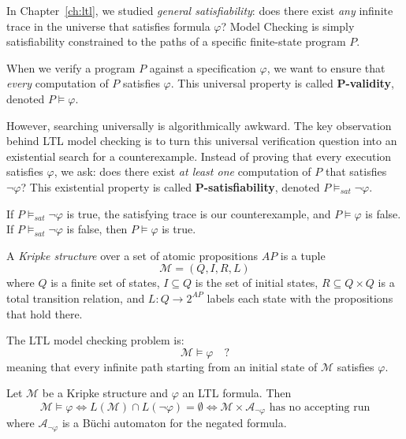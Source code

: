 In Chapter~\ref{ch:ltl}, we studied \emph{general satisfiability}: does there exist \emph{any} infinite trace in the universe that satisfies formula $\varphi$? Model Checking is simply satisfiability constrained to the paths of a specific finite-state program $P$.

When we verify a program $P$ against a specification $\varphi$, we want to ensure that \emph{every} computation of $P$ satisfies $\varphi$. This universal property is called \textbf{P-validity}, denoted $P \models \varphi$. 

However, searching universally is algorithmically awkward. The key observation behind LTL model checking is to turn this universal verification question into an existential search for a counterexample. Instead of proving that every execution satisfies $\varphi$, we ask: does there exist \emph{at least one} computation of $P$ that satisfies $\neg\varphi$? This existential property is called \textbf{P-satisfiability}, denoted $P \models_{sat} \neg\varphi$.

If $P \models_{sat} \neg\varphi$ is true, the satisfying trace is our counterexample, and $P \models \varphi$ is false. If $P \models_{sat} \neg\varphi$ is false, then $P \models \varphi$ is true.

\begin{definition}
\label{def:kripke-structure}
A \emph{Kripke structure} over a set of atomic propositions $AP$ is a tuple
\[
  \mathcal{M} = (Q, I, R, L)
\]
where $Q$ is a finite set of states, $I \subseteq Q$ is the set of initial
states, $R \subseteq Q \times Q$ is a total transition relation, and
$L : Q \to 2^{AP}$ labels each state with the propositions that hold there.
\end{definition}

The LTL model checking problem is:
\[
  \mathcal{M} \models \varphi \quad\text{?}
\]
meaning that every infinite path starting from an initial state of
$\mathcal{M}$ satisfies $\varphi$.

\begin{theorem}
\label{thm:ltl-mc-automata}
Let $\mathcal{M}$ be a Kripke structure and $\varphi$ an LTL formula.  Then
\[
  \mathcal{M} \models \varphi
  \iff
  L(\mathcal{M}) \cap L(\neg \varphi) = \emptyset
  \iff
  \mathcal{M} \times \mathcal{A}_{\neg\varphi}
  \text{ has no accepting run}
\]
where $\mathcal{A}_{\neg\varphi}$ is a B\"uchi automaton for the negated
formula.
\end{theorem}

